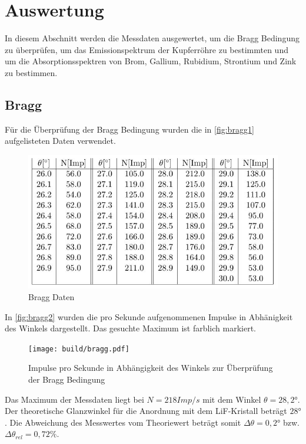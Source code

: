 \section{Auswertung}
\label{sec:Auswertung}
In diesem Abschnitt werden die Messdaten ausgewertet, um die Bragg Bedingung zu überprüfen, um das Emissionspektrum der Kupferröhre zu bestimmten und um die Absorptionsspektren von Brom, Gallium, Rubidium, Strontium und Zink zu bestimmen.
\subsection{Bragg}
Für die Überprüfung der Bragg Bedingung wurden die in \autoref{fig:bragg1} aufgelisteten Daten verwendet.
\begin{figure}[H]
  \centering
  \includegraphics{daten/bragg.JPG}
  \caption{Bragg Daten}
  \label{fig:bragg1}
\end{figure}
In \autoref{fig:bragg2} wurden die pro Sekunde aufgenommenen Impulse in Abhänigkeit des Winkels dargestellt. Das gesuchte Maximum ist farblich markiert.
\begin{figure}[H]
  \centering
  \texttt{[image: build/bragg.pdf]}
  \caption{Impulse pro Sekunde in Abhängigkeit des Winkels zur Überprüfung der Bragg Bedingung}
  \label{fig:bragg2}
\end{figure}
\noindent
Das Maximum der Messdaten liegt bei $N=218 Imp/s$ mit dem Winkel $\theta=28,2°$. Der theoretische Glanzwinkel für die Anordnung mit dem LiF-Kristall beträgt $28°$. Die Abweichung des Messwertes vom Theoriewert beträgt somit $\Delta \theta=0,2°$ bzw. $\Delta \theta_{rel}=0,72\%$.
